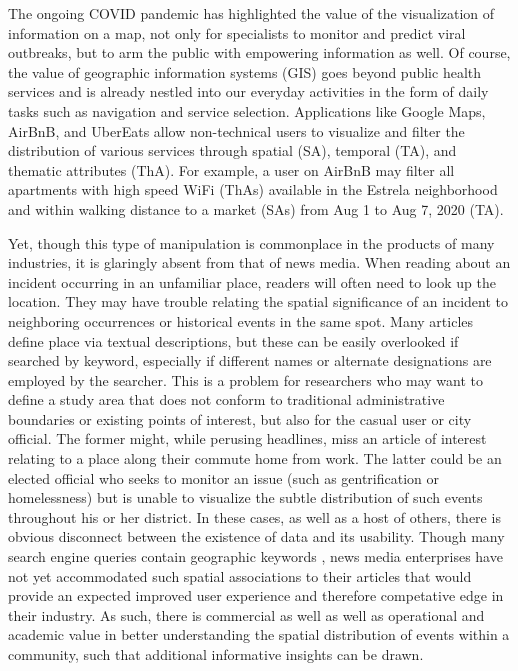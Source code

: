 The ongoing COVID pandemic has highlighted the value of the visualization of information on a map, not only for specialists to monitor and predict viral outbreaks, but to arm the public with empowering information as well. Of course, the value of geographic information systems (GIS) goes beyond public health services and is already nestled into our everyday activities in the form of daily tasks such as navigation and service selection. Applications like Google Maps, AirBnB, and UberEats allow non-technical users to visualize and filter the distribution of various services through spatial (SA), temporal (TA), and thematic attributes (ThA). For example, a user on AirBnB may filter all apartments with high
speed WiFi (ThAs) available in the Estrela neighborhood and within walking distance to a market (SAs) from Aug 1 to Aug 7, 2020 (TA).

Yet, though this type of manipulation is commonplace in the products of many industries, it is glaringly absent from that of news media. When reading about an incident occurring in an unfamiliar place, readers will often need to look up the location. They may have trouble relating the spatial significance of an incident to neighboring occurrences or historical events in the same spot. Many articles define place via textual descriptions, but these can be easily overlooked if searched by keyword, especially if different names or alternate designations are employed by the searcher. This is a problem for researchers who may want to define a study area that does not conform to traditional administrative boundaries or existing points of interest, but also for the casual user or city official. The former might, while perusing headlines, miss an article of interest relating to a place along their commute home from work. The latter could be an elected official who seeks to monitor an issue (such as gentrification or homelessness) but is unable to visualize the subtle distribution of such events throughout his or her district. In these cases, as well as a host of others, there is obvious disconnect between the existence of data and its usability. Though many search engine queries contain geographic keywords \cite{Silva2006}, news media enterprises have not yet accommodated such spatial associations to their articles that would provide an expected improved user experience and therefore competative edge in their industry. As such, there is commercial as well as well as operational and academic value in better understanding the spatial distribution of events within a community, such that additional informative insights can be drawn.

